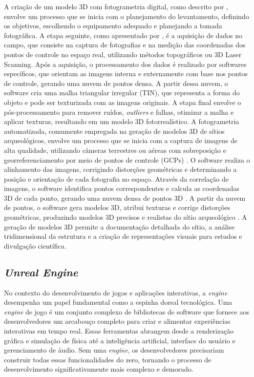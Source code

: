 A criação de um modelo 3D com fotogrametria digital, como descrito por \cite{silva2022realidade}, envolve um processo que se inicia com o planejamento do levantamento, definindo os objetivos, escolhendo o equipamento adequado e planejando a tomada fotográfica. A etapa seguinte, como apresentado por \cite{groetelaars2004estudo}, é a aquisição de dados no campo, que consiste na captura de fotografias e na medição das coordenadas dos pontos de controle no espaço real, utilizando métodos topográficos ou 3D Laser Scanning. Após a aquisição, o processamento dos dados é realizado por softwares específicos, que orientam as imagens interna e externamente com base nos pontos de controle, gerando uma nuvem de pontos densa. A partir dessa nuvem, o software cria uma malha triangular irregular (TIN), que representa a forma do objeto e pode ser texturizada com as imagens originais. A etapa final envolve o pós-processamento para remover ruídos, \textit{outliers} e falhas, otimizar a malha e aplicar texturas, resultando em um modelo 3D fotorrealístico.
A fotogrametria automatizada, comumente empregada na geração de modelos 3D de sítios arqueológicos, envolve um processo que se inicia com a captura de imagens de alta qualidade, utilizando câmeras terrestres ou aéreas com sobreposição e georreferenciamento por meio de pontos de controle (GCPs) \citep{McGlone2004}. O software realiza o alinhamento das imagens, corrigindo distorções geométricas e determinando a posição e orientação de cada fotografia no espaço. Através da correlação de imagens, o software identifica pontos correspondentes e calcula as coordenadas 3D de cada ponto, gerando uma nuvem densa de pontos 3D \citep{Heipke2001}. A partir da nuvem de pontos, o software gera modelos 3D, atribui texturas e corrige distorções geométricas, produzindo modelos 3D precisos e realistas do sítio arqueológico \citep{Gruen2008}. A geração de modelos 3D permite a documentação detalhada do sítio, a análise tridimensional da estrutura e a criação de representações visuais para estudos e divulgação científica.


\subsection{\textit{Unreal Engine}}No contexto do desenvolvimento de jogos e aplicações interativas, a \textit{engine} desempenha um papel fundamental como a espinha dorsal tecnológica. Uma \textit{engine} de jogo é um conjunto complexo de bibliotecas de software que fornece aos desenvolvedores um arcabouço completo para criar e alimentar experiências interativas em tempo real. Essas ferramentas abrangem desde a renderização gráfica e simulação de física até a inteligência artificial, interface do usuário e gerenciamento de áudio. Sem uma \textit{engine}, os desenvolvedores precisariam construir todas essas funcionalidades do zero, tornando o processo de desenvolvimento significativamente mais complexo e demorado. 

